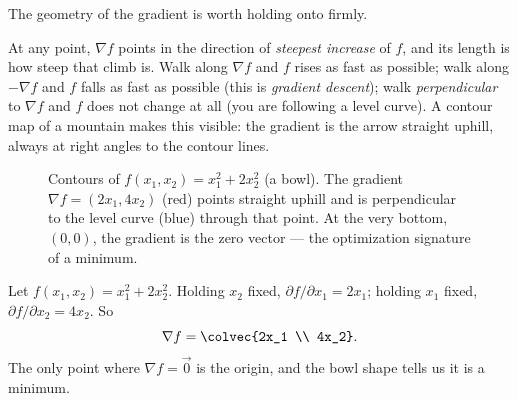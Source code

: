 The geometry of the gradient is worth holding onto firmly.

\begin{intuitionbox}
At any point, $\nabla f$ points in the direction of \emph{steepest increase} of $f$, and its length
is how steep that climb is. Walk along $\nabla f$ and $f$ rises as fast as possible; walk along
$-\nabla f$ and $f$ falls as fast as possible (this is \emph{gradient descent}); walk
\emph{perpendicular} to $\nabla f$ and $f$ does not change at all (you are following a level curve).
A contour map of a mountain makes this visible: the gradient is the arrow straight uphill, always at
right angles to the contour lines.
\end{intuitionbox}

\begin{figure}[H]
\centering
{}
\caption{Contours of $f(x_1,x_2) = x_1^2 + 2x_2^2$ (a bowl). The gradient $\nabla f = (2x_1, 4x_2)$
(red) points straight uphill and is perpendicular to the level curve (blue) through that point. At
the very bottom, $(0,0)$, the gradient is the zero vector --- the optimization signature of a
minimum.}
\label{ch39:fig-gradient}
\end{figure}

\begin{example}
\label{ch39:ex-grad}
Let $f(x_1, x_2) = x_1^2 + 2x_2^2$. Holding $x_2$ fixed, $\partial f/\partial x_1 = 2x_1$; holding
$x_1$ fixed, $\partial f/\partial x_2 = 4x_2$. So
\[
\nabla f = \colvec{2x_1 \\ 4x_2}.
\]
The only point where $\nabla f = \vec{0}$ is the origin, and the bowl shape tells us it is a minimum.
\end{example}

